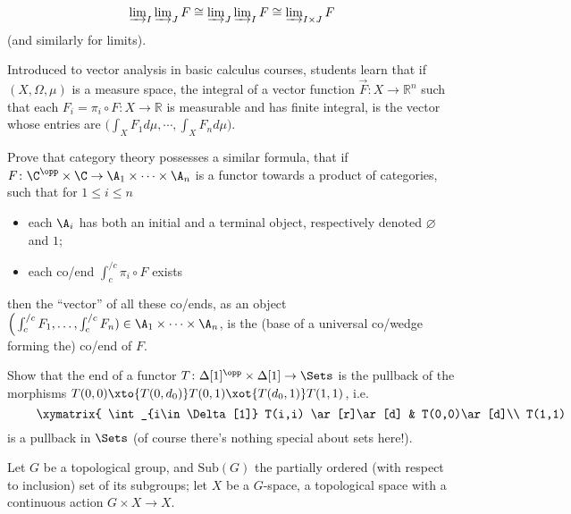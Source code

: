 \begin{exerciseset}
\begin{exercisepoints}
\[\textstyle 
\varinjlim_I \varinjlim_J F\cong \varinjlim_J \varinjlim_I F\cong \varinjlim_{I\times J}F
\]
(and similarly for limits).
\item \label{ex1:vector-of-coends} Introduced to vector analysis in basic calculus courses, students learn that if $(X, \Omega, \mu)$ is a measure space, the integral of a vector function $\vec F \colon X \to \mathbb{R}^n$ such that each $F_i = \pi_i \circ F\colon X\to \mathbb R$ is measurable and has finite integral, is the vector whose entries are $\Big(\int_X F_1 d\mu, \cdots, \int_X F_n d\mu \Big)$. 

Prove that category theory possesses a similar formula, \ie that if $F\colon \C^\opp\times \C \to \A_1\times \cdots \times \A_n$ is a functor towards a product of categories, such that 
for $1\le i\le n$
\begin{itemize}
\item each $\A_i$ has both an initial and a terminal object, respectively denoted $\varnothing$ and $1$;
\item each co/end $\int_c^{/c} \pi_i\circ F$ exists 
\end{itemize}
then the ``vector'' of all these co/ends, as an object $\Big( \int_c^{/c} F_1 , \dots, \int_c^{/c} F_n) \in \A_1\times\cdots \times \A_n$, is the (base of a universal co/wedge forming the) co/end of $F$. 
\item \label{ispull} Show that the end of a functor $T\colon \Delta[1]^\opp\times \Delta[1]\to \Sets$ is the pullback of the morphisms $T(0,0)\xto{T(0,d_0)} T(0,1)\xot{T(d_0,1)}T(1,1)$, i.e\@. 
\[
	\vcenter{\xymatrix{
     \int_{i\in\Delta[1]} T(i,i) \ar[r]\ar[d] & T(0,0)\ar[d]\\
     T(1,1) \ar[r] & T(0,1)
	}}
\]
is a pullback in $\Sets$ (of course there's nothing special about sets here!).
\item \label{ex1:forgroups} Let $G$ be a topological group, and $\text{Sub}(G)$ the partially ordered (with respect to inclusion) set of its subgroups; let $X$ be a $G$-space, \ie a topological space with a continuous action $G\times X \to X$.


\end{exercisepoints}
\end{exerciseset}
